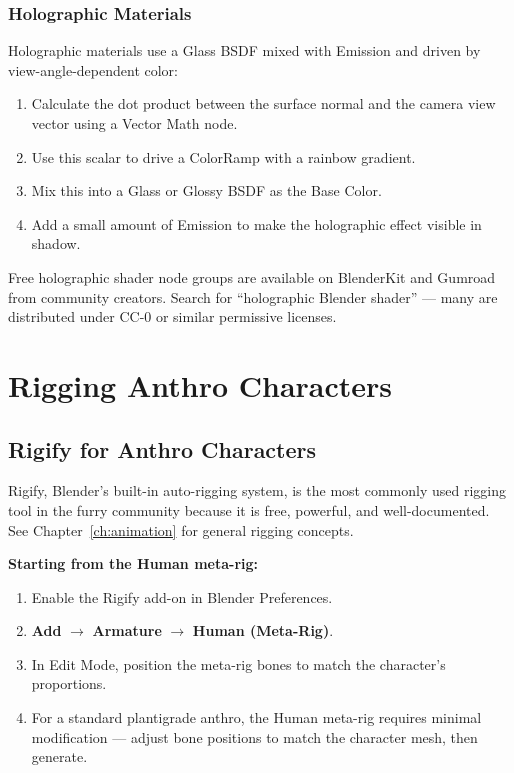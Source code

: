 \subsubsection{Holographic Materials}

Holographic materials use a Glass BSDF mixed with Emission and driven by view-angle-dependent color:

\begin{enumerate}[leftmargin=2em]
  \item Calculate the dot product between the surface normal and the camera view vector using a Vector Math node.
  \item Use this scalar to drive a ColorRamp with a rainbow gradient.
  \item Mix this into a Glass or Glossy BSDF as the Base Color.
  \item Add a small amount of Emission to make the holographic effect visible in shadow.
\end{enumerate}

\begin{tipbox}
Free holographic shader node groups are available on BlenderKit and Gumroad from community creators. Search for ``holographic Blender shader'' --- many are distributed under CC-0 or similar permissive licenses.
\end{tipbox}



\section{Rigging Anthro Characters}
\label{sec:furry-rigging}

\subsection{Rigify for Anthro Characters}

Rigify, Blender's built-in auto-rigging system, is the most commonly used rigging tool in the furry community because it is free, powerful, and well-documented. See Chapter~\ref{ch:animation} for general rigging concepts.

\textbf{Starting from the Human meta-rig:}

\begin{enumerate}[leftmargin=2em]
  \item Enable the Rigify add-on in Blender Preferences.
  \item \textbf{Add} $\rightarrow$ \textbf{Armature} $\rightarrow$ \textbf{Human (Meta-Rig)}.
  \item In Edit Mode, position the meta-rig bones to match the character's proportions.
  \item For a standard plantigrade anthro, the Human meta-rig requires minimal modification --- adjust bone positions to match the character mesh, then generate.
\end{enumerate}

